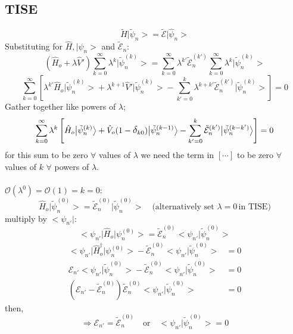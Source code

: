 \documentclass[12pt,fancychapters]{report}
\numberwithin{equation}{section}
\begin{document}
\subsection*{TISE}
\begin{equation*}
	\tilde{H}\big|\tilde{\psi}_n\big> = \tilde{\mathcal{E}}\big|\hat{\psi}_n\big>
\end{equation*}
Substituting for $\hat{H}, \big|\hat{\psi}_n\big>$ and $\tilde{\mathcal{E}}_n$:
\begin{equation*}
\left(\hat{H}_o + \lambda\hat{V}'\right) \sum_{k=0}^{\infty}\lambda^k \big|
\tilde{\psi}_n^{(k)}\big> = \sum_{k=0}^{\infty}\lambda^{k'}\tilde{\mathcal{E}}_n^{(k')}
\sum_{k=0}^{\infty}\lambda^{k}\big|\tilde{\psi}_n^{(k)}\big>
\end{equation*}
\[
\sum_{k=0}^{\infty}\left[\lambda^{k'}\hat{H}_o \big|\tilde{\psi}_n^{(k)}\big>
+ \lambda^{k+1}\hat{V}'\big|\tilde{\psi}_n^{(k)}\big> - \sum_{k'=0}^{k}\lambda^{k+k'}
\tilde{\mathcal{E}}_n^{(k')} \big|\tilde{\psi}_n^{(k)}\big>\right]=0\]
Gather together like powers of $\lambda$;
\[
	\sum_{k=0}^{\infty}\lambda^k\left[\hat{H}_o\big|\tilde{\psi}_n^{(k)}\big>+\hat{V}_o (
	1-\mathlarger{\delta}_{k0})\big|\tilde{\psi}_n^{(k-1)}\big>-\sum_{k'=0}^{k}
\tilde{\mathcal{E}}_n^{(k')}\big|\tilde{\psi}_n^{(k-k')}\big>\right] =0
\]
for this sum to be zero $\forall$ values of $\lambda$ we need the term in $[\cdots]$  to be zero
$\forall$ values of $k$ $\forall$ powers of $\lambda$.\\
\\
$\mathcal{O}(\lambda^0)=\mathcal{O}(1)=k=0$:
\[\hat{H}_o\big|\tilde{\psi}_n^{(0)} \big> = \tilde{\mathcal{E}}_n^{(0)}\big|\tilde{\psi}_n^{(0)}
\big>\quad {(\text{alternatively set }\lambda=0}\,\text{in TISE} )\]
multiply by $\big<\psi_{n'}\big|$: 
\[\big<\psi_{n'}\big|\hat{H}_o\big|\psi_{n}^{(0)}\big> = \tilde{\mathcal{E}}_n^{(0)} \big<\psi_{n'}
\big|\tilde{\psi}_n^{(0)}\big>\]
\begin{align*}
\big<\psi_{n'}\big|\hat{H}^\dagger_o\big|\psi_{n}^{(0)}\big>	-
\tilde{\mathcal{E}}_n^{(0)} \big<\psi_{n'}\big|\tilde{\psi}_n^{(0)}\big> &= 0\\
\mathcal{E}_{n'}\big<\psi_{n'}\big|\tilde{\psi}_n^{(0)}\big> -  
\tilde{\mathcal{E}}_n^{(0)} \big<\psi_{n'}\big|\tilde{\psi}_n^{(0)}\big> & = 0 \\
\left(\mathcal{E}_{n'}- \tilde{\mathcal{E}}_n^{(0)}\right)\tilde{\mathcal{E}}_n^{(0)} 
\big<\psi_{n'}\big|\tilde{\psi}_n^{(0)}\big> &= 0
\end{align*}
then, 
\[\Rightarrow \mathcal{E}_{n'} = \tilde{\mathcal{E}}_n^{(0)}\quad \text{or}\quad 
\big<\psi_{n'}\big|\tilde{\psi}_n^{(0)}\big> = 0\]
\end{document}
